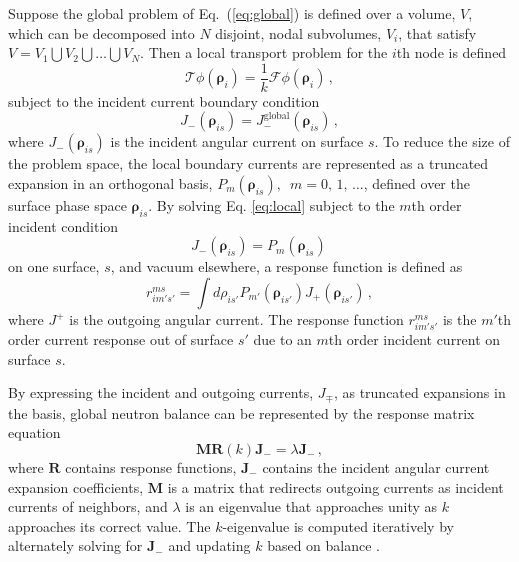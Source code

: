 \documentclass{anstrans}
\newcommand{\EQ}[1]{Eq.~(\ref{#1})}               %
\begin{document}
Suppose the global problem of \EQ{eq:global} is defined over a
volume, $V$, which can be decomposed into $N$ disjoint, nodal subvolumes,
$V_i$, that satisfy $V = V_1 \bigcup V_2 \bigcup \ldots \bigcup V_N$.
Then a local transport problem for the $i$th node is defined
\begin{equation}
  \mathcal{T} \phi(\bm{\rho}_i) =
    \frac{1}{k} \mathcal{F} \phi(\bm{\rho}_i) \, ,
  \label{eq:local}
\end{equation}
subject to the incident current boundary condition
\begin{equation}
  J^{\mathrm{}}_{-} (\bm{\rho}_{is}) =
    J^{\mathrm{global}}_{-}(\bm{\rho}_{is}) \, ,
  \label{eq:localbc}
\end{equation}
where $J_{-} (\bm{\rho}_{is}) $ is the incident angular current on
surface $s$.  To reduce the size of the problem space, the local boundary
currents are represented as a truncated
expansion in an
orthogonal basis, $P_m(\bm{\rho}_{is}), \,\,\, m = 0, \, 1, \, \ldots$,
defined over the surface phase space $\bm{\rho}_{is}$.
By solving Eq. \ref{eq:local} subject to the $m$th order
incident condition
\begin{equation}
 J^{}_{-} (\bm{\rho}_{is}) = P_m(\bm{\rho}_{is}) \,
\end{equation}
on one surface, $s$, and vacuum elsewhere,
a response function is defined as
\begin{equation}
       r^{ms}_{im's'} = \int d\rho_{is'} P_{m'}(\bm{\rho}_{is'})
        J_{+} (\bm{\rho}_{is'}) \, ,
\label{eq:responsefunction}
\end{equation}
where $J^+$ is the outgoing angular current.  The
response function $r^{ms}_{im's'}$
is the $m'$th order current response out of
surface $s'$ due to an $m$th order incident current on
surface $s$.

By expressing the incident and outgoing currents, $J_{\mp}$, as truncated
expansions in the basis, global neutron balance can be represented by the
response matrix equation
\begin{equation}
  \mathbf{M}\mathbf{R}(k)\mathbf{J_-}  = \lambda \mathbf{J_-} \, ,
\label{eq:erme}
\end{equation}
where $\mathbf{R}$ contains response functions, $\mathbf{J}_{-}$ contains the
incident angular current expansion coefficients, $\mathbf{M}$ is a matrix that
redirects outgoing currents as incident currents of neighbors, and $\lambda$ is
an eigenvalue that approaches unity as $k$ approaches its correct value. The
$k$-eigenvalue is computed iteratively by alternately solving for
$\mathbf{J}_{-}$ and updating $k$ based on balance \cite{RobertsSerment}.
\end{document}
